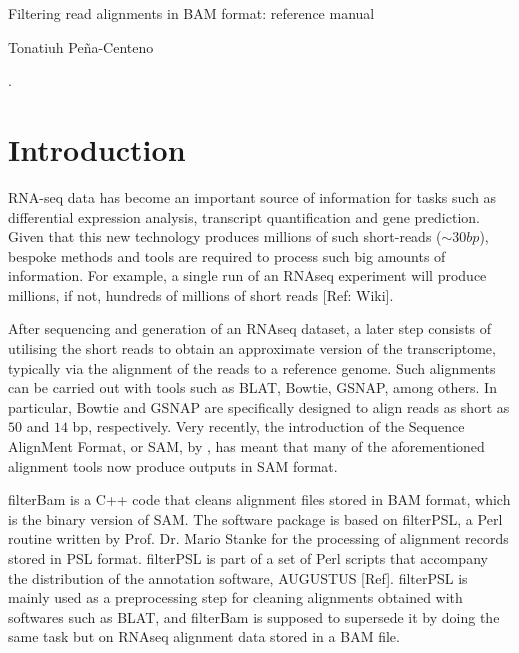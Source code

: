 \documentclass[11pt]{article}
\begin{document}
{%
\newpage
\begin{center}
{\LARGE Filtering read alignments in BAM format: reference manual}
\end{center}

\begin{center}
{\large
Tonatiuh Pe\~{n}a-Centeno \\ 
\date{\today}
}
\end{center}

. 

\section{Introduction}
RNA-seq data has become an important source of information for tasks such as differential 
expression analysis, transcript quantification and gene prediction. Given that this new technology 
produces millions of such short-reads ($\sim30bp$), bespoke methods and tools are required to process such big 
amounts of information. For example, a single run of an RNAseq experiment will produce millions, if not, 
hundreds of millions of short reads [Ref: Wiki].

After sequencing and generation of an RNAseq dataset, a later step consists of utilising the short 
reads to obtain an approximate 
version of the transcriptome, typically via the alignment of the reads to a reference genome. 
Such alignments can be carried out with tools such as BLAT, Bowtie, GSNAP, among others. In particular, 
Bowtie and GSNAP are specifically designed to align reads as short as $50$ and $14$ bp, respectively. 
Very recently, the introduction of the Sequence AlignMent Format, or SAM, by \citet{heng09:SAM}, has meant 
that many of the aforementioned alignment tools now produce outputs in SAM format. 

filterBam is a C++ code that cleans alignment files stored in BAM format, which is the binary version of 
SAM. The software package is based on filterPSL, a Perl routine written by Prof. Dr. Mario Stanke for the processing of 
alignment records stored in PSL format. filterPSL is part of a set of Perl scripts that accompany the 
distribution of the annotation software, AUGUSTUS [Ref]. filterPSL is mainly used as a preprocessing step 
for cleaning alignments obtained with softwares such as BLAT, and filterBam is supposed to supersede 
it by doing the same task but on RNAseq alignment data stored in a BAM file. 

}
\end{document}
